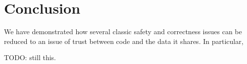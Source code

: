 \chapter{Conclusion}
\label{ch:outro}

We have demonstrated how several classic safety and correctness issues can
be reduced to an issue of trust between code and the data it shares. In particular,

TODO: still this.
